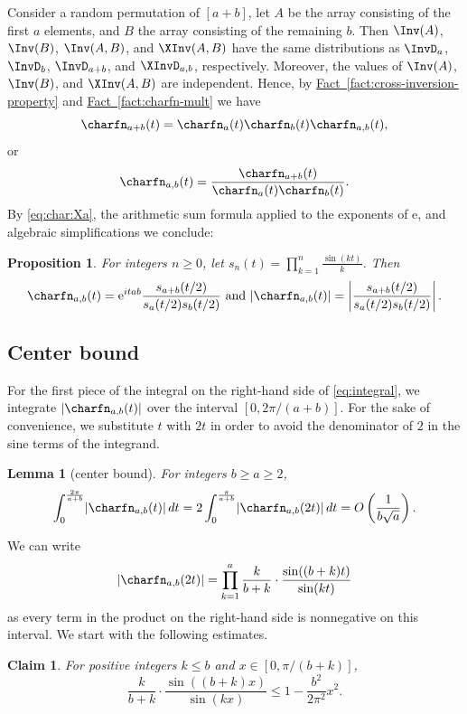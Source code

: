 \documentclass[11pt]{article}
\numberwithin{equation}{section}
\newtheorem{lemma}[theorem]{Lemma}
\newtheorem{proposition}[theorem]{Proposition}
\newtheorem{claim}[theorem]{Claim}
\theoremstyle{definition}
\theoremstyle{plain}
\newcommand{\eee}{\mathrm e}
\newcommand{\expref}[2]{\hyperref[#2]{#1~\ref{#2}}}
\begin{document}
Consider a random permutation of $[a+b]$, let $A$ be the array consisting of the first $a$ elements, and $B$ the array consisting of the remaining $b$. Then $\Inv(A)$, $\Inv(B)$, $\Inv(A,B)$, and $\XInv(A,B)$ have the same distributions as $\InvD_a$, $\InvD_b$, $\InvD_{a+b}$, and $\XInvD_{a,b}$, respectively. Moreover, the values of $\Inv(A)$, $\Inv(B)$, and $\XInv(A,B)$ are independent. Hence, by \expref{Fact}{fact:cross-inversion-property} and \expref{Fact}{fact:charfn-mult} we have
\[\charfn_{a+b}(t)=\charfn_{a}(t)\charfn_{b}(t)\charfn_{a,b}(t), \]
or
\[\charfn_{a,b}(t)=\frac{\charfn_{a+b}(t)}{\charfn_a(t)\charfn_b(t)}. \]
By \eqref{eq:char:Xa}, the arithmetic sum formula applied to the exponents of $\eee$, and algebraic simplifications we conclude:
\begin{proposition}
\label{prop:characteristicfunction}
For integers $n\ge 0$, let $s_n(t)=\prod_{k=1}^n\frac{\sin(kt)}{k}$. Then 
    \[\charfn_{a,b}(t)=\eee^{itab}\frac{s_{a+b}(t/2)}{s_a(t/2)s_b(t/2)}
    \text{ and } \lvert\charfn_{a,b}(t)\rvert=\left| \frac{s_{a+b}(t/2)}{s_a(t/2)s_b(t/2)}\right|. 
    \]
\end{proposition}

\subsection{Center bound}
\label{sec:central}

For the first piece of the integral on the right-hand side of \eqref{eq:integral}, we integrate $\lvert\charfn_{a,b}(t)\rvert$ over the interval $[0,2\pi/(a+b)]$. For the sake of convenience, we substitute $t$ with $2t$ in order to avoid the denominator of $2$ in the sine terms of the integrand. 

\begin{lemma}[center bound]
    \label{lemma:center}
    For integers $b\ge a\ge 2$,
    \[ \int_0^{\frac{2\pi}{a+b}} \lvert\charfn_{a,b}(t)\rvert\, dt = 2 \int_0^{\frac{\pi}{a+b}} \lvert\charfn_{a,b}(2t)\rvert\, dt = O\left(\frac{1}{b\sqrt{a}}\right). \]    
\end{lemma}

We can write 
\[\lvert\charfn_{a,b}(2t)\rvert=\prod_{k=1}^{a} \frac{k}{b+k}\cdot\frac{\sin((b+k)t)}{\sin(kt)} \]
as every term in the product on the right-hand side is nonnegative on this interval. We start with the following estimates.

\begin{claim}
    \label{claim:center3}
    For positive integers $k\le b$ and $x\in [0,\pi/(b+k)]$,
    \[\frac{k}{b+k}\cdot \frac{\sin((b+k)x)}{\sin(kx)}\le 1-\frac{b^2}{2\pi^2}x^2. \]
\end{claim}
\end{document}
